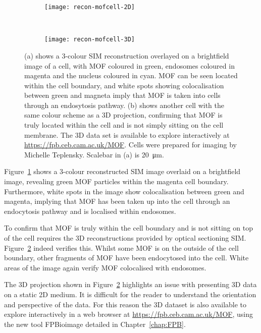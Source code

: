 \begin{figure}[tbp!]
\centering
\begin{subfigure}[b]{0.7\textwidth}
	\texttt{[image: recon-mofcell-2D]}
	\caption{}\label{fig:recon-mofcell-2D}
\end{subfigure}

~\newline
\begin{subfigure}[b]{0.7\textwidth}
	\texttt{[image: recon-mofcell-3D]}
	\caption{}\label{fig:recon-mofcell-3D}
\end{subfigure}
\caption[LAG SIM: 3D reconstruction of HeLa cells]{(a) shows a 3-colour SIM reconstruction overlayed on a brightfield image of a cell, with MOF coloured in green, endosomes coloured in magenta and the nucleus coloured in cyan. MOF can be seen located within the cell boundary, and white spots showing colocalisation between green and magneta imply that MOF is taken into cells through an endosytosis pathway. (b) shows another cell with the same colour scheme as a 3D projection, confirming that MOF is truly located within the cell and is not simply sitting on the cell membrane. The 3D data set is available to explore interactively at \url{https://fpb.ceb.cam.ac.uk/MOF}. Cells were prepared for imaging by Michelle Teplensky. Scalebar in (a) is \SI{20}{\micro\metre}. }
\label{fig:recon-mofcell}
\end{figure}
\afterpage{\clearpage}

Figure~\ref{fig:recon-mofcell-2D} shows a 3-colour reconstructed SIM image overlaid on a brightfield image, revealing green MOF particles within the magenta cell boundary. 
Furthermore, white spots in the image show colocalisation between green and magenta, implying that MOF has been taken up into the cell through an endocytosis pathway and is localised within endosomes. 

To confirm that MOF is truly within the cell boundary and is not sitting on top of the cell requires the 3D reconstructions provided by optical sectioning SIM. 
Figure~\ref{fig:recon-mofcell-3D} indeed verifies this.
Whilst some MOF is on the outside of the cell boundary, other fragments of MOF have been endocytosed into the cell. 
White areas of the image again verify MOF colocalised with endosomes. 

The 3D projection shown in Figure~\ref{fig:recon-mofcell-3D} highlights an issue with presenting 3D data on a static 2D medium. 
It is difficult for the reader to understand the orientation and perspective of the data.
For this reason the 3D dataset is also available to explore interactively in a web browser at \url{https://fpb.ceb.cam.ac.uk/MOF}, using the new tool FPBioimage detailed in Chapter~\ref{chap:FPB}. 

